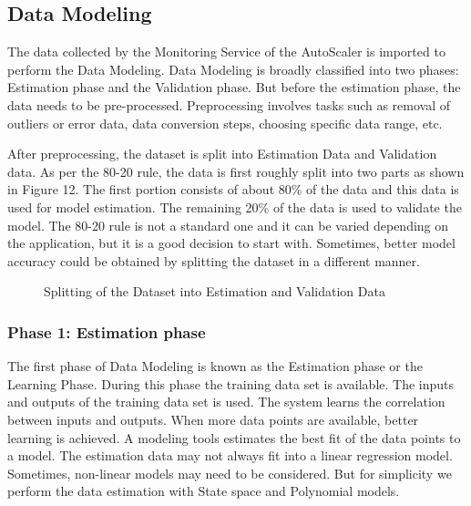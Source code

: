 \documentclass[article,type=msc,colorback,12pt,accentcolor=tud7b,table]{tudthesis}
\begin{document}
 	\subsection{Data Modeling}
 	
 	The data collected by the Monitoring Service of the AutoScaler is imported to perform the Data Modeling. Data Modeling is broadly classified into two phases: Estimation phase and the Validation phase. But before the estimation phase, the data needs to be pre-processed. Preprocessing involves tasks such as removal of outliers or error data, data conversion steps, choosing specific data range, etc. 
 	
 	After preprocessing, the dataset is split into Estimation Data and Validation data. As per the 80-20 rule, the data is first roughly split into two parts as shown in Figure 12. The first portion consists of about 80\% of the data and this data is used for model estimation. The remaining 20\% of the data is used to validate the model. The 80-20 rule is not a standard one and it can be varied depending on the application, but it is a good decision to start with. Sometimes, better model accuracy could be obtained by splitting the dataset in a different manner.
 	
 	 	 \begin{figure}[!h]
 	 	 	\begin{center}
 	 	 		\makebox[\textwidth]{\texttt{[image: C5]}}
 	 	 	\end{center}
 	 	 	\caption{Splitting of the Dataset into Estimation and Validation Data}
 	 	 \end{figure}
 	
 	\subsubsection{Phase 1: Estimation phase}
 	
 	The first phase of Data Modeling is known as the Estimation phase or the Learning Phase. During this phase the training data set is available. The inputs and outputs of the training data set is used. The system learns the correlation between inputs and outputs. When more data points are available, better learning is achieved. A modeling tools estimates the best fit of the data points to a model. The estimation data may not always fit into a linear regression model. Sometimes, non-linear models may need to be considered. But for simplicity we perform the data estimation with State space and Polynomial models.
 	
\end{document}

